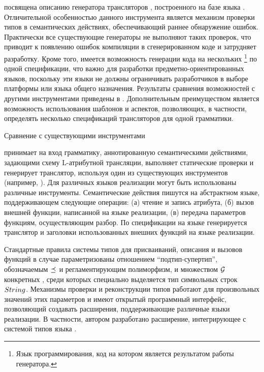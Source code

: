  посвящена описанию генератора трансляторов \ATF{}, построенного на базе языка \GRM{}. Отличительной особенностью данного инструмента является механизм проверки типов в семантических действиях, обеспечивающий раннее обнаружение ошибок. Практически все существующие генераторы не выполняют таких проверок, что приводит к появлению ошибок компиляции в сгенерированном коде и затрудняет разработку. Кроме того, имеется возможность генерации кода на нескольких \footnote{Язык программирования, код на котором является результатом работы генератора.} по одной спецификации, что важно для разработки предметно-ориентированных языков, поскольку эти языки не должны ограничивать разработчиков в выборе платформы или языка общего назначения. Результаты сравнения возможностей \ATF{} с другими инструментами приведены в . Дополнительным преимуществом \ATF{} является возможность использования шаблонов и аспектов, позволяющих, в частности, определять несколько спецификаций трансляторов для одной грамматики.

\begin{table}[htbp]
	\centering
\newcommand{\size}{\small}
\newcommand{\dissonly}[1]{}
	
	\caption{Сравнение \ATF{} с существующими инструментами}\label{AtfTable}
\end{table}

\ATF{} принимает на вход грамматику, аннотированную семантическими действиями, задающими схему L-атрибутной трансляции, выполняет статические проверки и генерирует транслятор, используя один из существующих инструментов (например, ). Для различных языков реализации могут быть использованы различные инструменты. Семантические действия пишутся на абстрактном языке, поддерживающем следующие операции: (а) чтение и запись атрибута, (б) вызов внешней функции, написанной на языке реализации, (в) передача параметров функциям, осуществляющим разбор. По спецификации на языке \ATF{} генерируется транслятор и заголовки использованных внешних функций на языке реализации.

Стандартные правила системы типов для присваиваний, описания и вызовов функций в случае \ATF{} параметризованы отношением ``подтип-супертип'', обозначаемым $\preceq_{}$ и регламентирующим полиморфизм, и множеством ${\mathcal{G}_{}}$ конкретных , среди которых специально выделяется тип символьных строк $String_{}$. Механизмы проверки и реконструкции типов работают для произвольных значений этих параметров и имеют открытый программный интерфейс, позволяющий создавать расширения, поддерживающие различные языки реализации. В частности, автором разработано расширение, интегрирующее \ATF{} с системой типов языка . 

